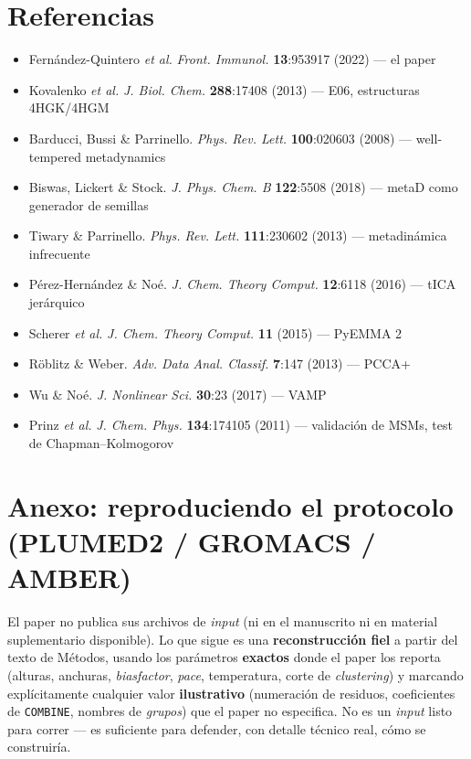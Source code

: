 \documentclass[11pt]{article}
\begin{document}
\section*{Referencias}
\begin{itemize}
  \item Fernández-Quintero \textit{et al.} \textit{Front. Immunol.} \textbf{13}:953917 (2022) --- el paper
  \item Kovalenko \textit{et al.} \textit{J. Biol. Chem.} \textbf{288}:17408 (2013) --- E06, estructuras 4HGK/4HGM
  \item Barducci, Bussi \& Parrinello. \textit{Phys. Rev. Lett.} \textbf{100}:020603 (2008) --- well-tempered metadynamics
  \item Biswas, Lickert \& Stock. \textit{J. Phys. Chem. B} \textbf{122}:5508 (2018) --- metaD como generador de semillas
  \item Tiwary \& Parrinello. \textit{Phys. Rev. Lett.} \textbf{111}:230602 (2013) --- metadinámica infrecuente
  \item Pérez-Hernández \& Noé. \textit{J. Chem. Theory Comput.} \textbf{12}:6118 (2016) --- tICA jerárquico
  \item Scherer \textit{et al.} \textit{J. Chem. Theory Comput.} \textbf{11} (2015) --- PyEMMA 2
  \item Röblitz \& Weber. \textit{Adv. Data Anal. Classif.} \textbf{7}:147 (2013) --- PCCA+
  \item Wu \& Noé. \textit{J. Nonlinear Sci.} \textbf{30}:23 (2017) --- VAMP
  \item Prinz \textit{et al.} \textit{J. Chem. Phys.} \textbf{134}:174105 (2011) --- validación de MSMs, test de Chapman--Kolmogorov
\end{itemize}

\newpage
\appendix
\section*{Anexo: reproduciendo el protocolo (PLUMED2 / GROMACS / AMBER)}

\begin{aviso}
El paper no publica sus archivos de \textit{input} (ni en el manuscrito ni en material suplementario disponible). Lo que sigue es una \textbf{reconstrucción fiel} a partir del texto de Métodos, usando los parámetros \textbf{exactos} donde el paper los reporta (alturas, anchuras, \textit{biasfactor}, \textit{pace}, temperatura, corte de \textit{clustering}) y marcando explícitamente cualquier valor \textbf{ilustrativo} (numeración de residuos, coeficientes de \texttt{COMBINE}, nombres de \textit{grupos}) que el paper no especifica. No es un \textit{input} listo para correr --- es suficiente para defender, con detalle técnico real, cómo se construiría.
\end{aviso}
\end{document}
